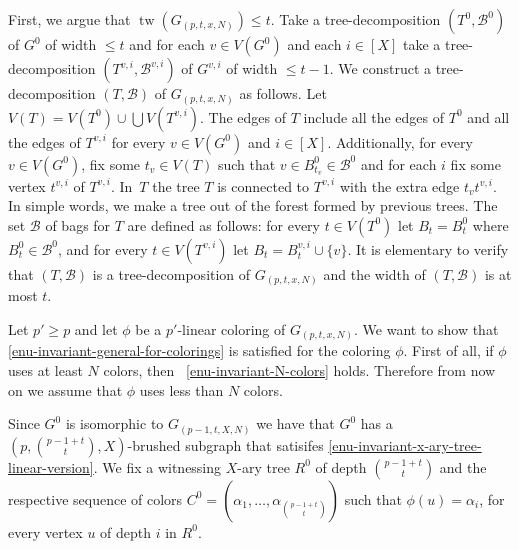First, we argue that $\operatorname{tw}(G_{(p,t,x,N)})\leq t$. Take a tree-decomposition
$(T^0,\mathcal{B}^0)$ of $G^0$ of width $\leq t$ and for each $v\in V(G^0)$ and each
$i\in[X]$ take a tree-decomposition $(T^{v,i},\mathcal{B}^{v,i})$ of $G^{v,i}$ of
width $\leq t-1$.  We construct a tree-decomposition $(T,\mathcal{B})$ of
$G_{(p,t,x,N)}$ as follows.  Let $V(T)= V(T^0)\cup\bigcup V(T^{v,i})$.  The
edges of $T$ include all the edges of $T^0$ and all the edges of $T^{v,i}$ for
every $v\in V(G^0)$ and $i\in[X]$.  Additionally, for every $v\in V(G^0)$, fix
some $t_v\in V(T)$ such that $v\in B^0_{t_v}\in\mathcal{B}^0$ and for each $i$ fix
some vertex $t^{v,i}$ of $T^{v,i}$.  In~$T$ the tree $T$ is connected to
$T^{v,i}$ with the extra edge $t_v t^{v,i}$. In simple words, we make a tree
out of the forest formed by previous trees.  The set $\mathcal{B}$ of bags for $T$
are defined as follows: for every $t\in V(T^0)$ let $B_t = B^0_t$ where
$B^0_t \in \mathcal{B}^0$, and for every $t \in V(T^{v,i})$ let
$B_t = B^{v,i}_t\cup\{v\}$.  It is elementary to verify that $(T,\mathcal{B})$ is
a tree-decomposition of $G_{(p,t,x,N)}$ and the width of $(T,\mathcal{B})$ is at
most $t$.

Let $p'\geq p$ and let $\phi$ be a $p'$-linear coloring of $G_{(p,t,x,N)}$.
We want to show that \eqref{enu-invariant-general-for-colorings} is satisfied for the coloring
$\phi$.  
First of all, if $\phi$ uses at least $N$ colors, then~ \eqref{enu-invariant-N-colors} holds.
Therefore from now on we assume that $\phi$ uses less than $N$ colors.

Since $G^0$ is isomorphic to $G_{(p-1,t,X,N)}$ we have that $G^0$ has a
$\left(p,\binom{p-1+t}{t},X\right)$-brushed subgraph that satisifes
\eqref{enu-invariant-x-ary-tree-linear-version}.  We fix a witnessing $X$-ary
tree $R^0$ of depth $\binom{p-1+t}{t}$ and the respective sequence of colors
$C^0=\left(\alpha_1,\ldots,\alpha_{\binom{p-1+t}{t}}\right)$ such that
$\phi(u)=\alpha_i$, for every 
vertex $u$ of depth $i$ in $R^0$.


